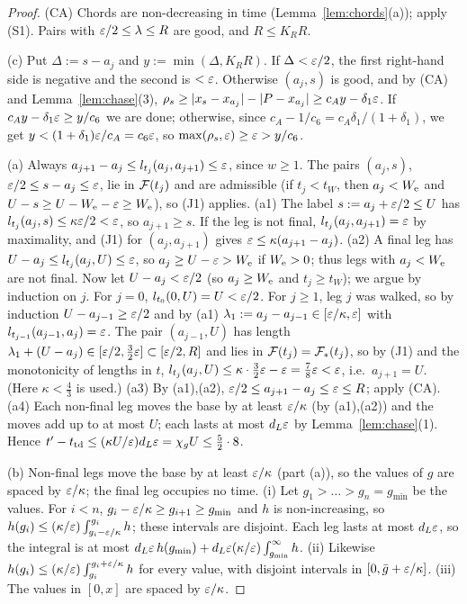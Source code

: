 \begin{proof}
(CA) Chords are non-decreasing in time (Lemma~\ref{lem:chords}(a)); apply (S1). Pairs with $\varepsilon/2\le\lambda\le R$ are
good, and $R\le K_RR$.

(c) Put $\Delta:=s-a_j$ and $y:=\min(\Delta,K_RR)$. If $\Delta<\varepsilon/2$, the first right-hand side is negative and the second is
$<\varepsilon$. Otherwise $(a_j,s)$ is good, and by (CA) and Lemma~\ref{lem:chase}(3),
$\rho_s\ge|x_s-x_{a_j}|-|P-x_{a_j}|\ge c_Ay-\delta_1\varepsilon$. If $c_Ay-\delta_1\varepsilon\ge y/c_6$ we are done; otherwise,
since $c_A-1/c_6=c_A\delta_1/(1+\delta_1)$, we get $y<(1+\delta_1)\varepsilon/c_A=c_6\varepsilon$, so $\max(\rho_s,\varepsilon)\ge\varepsilon>y/c_6$.

(a) Always $a_{j+1}-a_j\le l_{t_j}(a_j,a_{j+1})\le\varepsilon$, since $w\ge1$. The pairs $(a_j,s)$, $\varepsilon/2\le s-a_j\le\varepsilon$,
lie in $\mathcal{F}(t_j)$ and are admissible (if $t_j<t_W$, then $a_j<W_{\mathrm{e}}$ and $U-s\ge U-W_{\mathrm{e}}-\varepsilon\ge W_{\mathrm{e}}$), so (J1) applies.
(a1) The label $s:=a_j+\varepsilon/2\le U$ has $l_{t_j}(a_j,s)\le\kappa\varepsilon/2<\varepsilon$, so $a_{j+1}\ge s$. If the leg is not
final, $l_{t_j}(a_j,a_{j+1})=\varepsilon$ by maximality, and (J1) for $(a_j,a_{j+1})$ gives $\varepsilon\le\kappa(a_{j+1}-a_j)$.
(a2) A final leg has $U-a_j\le l_{t_j}(a_j,U)\le\varepsilon$, so $a_j\ge U-\varepsilon>W_{\mathrm{e}}$ if $W_{\mathrm{e}}>0$; thus legs with $a_j<W_{\mathrm{e}}$ are
not final. Now let $U-a_j<\varepsilon/2$ (so $a_j\ge W_{\mathrm{e}}$ and $t_j\ge t_W$); we argue by induction on $j$. For $j=0$,
$l_{t_0}(0,U)=U<\varepsilon/2$. For $j\ge1$, leg $j$ was walked, so by induction $U-a_{j-1}\ge\varepsilon/2$ and by (a1)
$\lambda_1:=a_j-a_{j-1}\in[\varepsilon/\kappa,\varepsilon]$ with $l_{t_{j-1}}(a_{j-1},a_j)=\varepsilon$. The pair $(a_{j-1},U)$ has length
$\lambda_1+(U-a_j)\in[\varepsilon/2,\frac32\varepsilon]\subset[\varepsilon/2,R]$ and lies in $\mathcal{F}(t_j)=\mathcal{F}_*(t_j)$, so by (J1) and the
monotonicity of lengths in $t$,
$l_{t_j}(a_j,U)\le\kappa\cdot\frac32\varepsilon-\varepsilon=\frac78\varepsilon<\varepsilon$, i.e.\ $a_{j+1}=U$. (Here $\kappa<\frac43$ is used.)
(a3) By (a1),(a2), $\varepsilon/2\le a_{j+1}-a_j\le\varepsilon\le R$; apply (CA).
(a4) Each non-final leg moves the base by at least $\varepsilon/\kappa$ (by (a1),(a2)) and the moves add up to at most $U$; each
lasts at most $d_L\varepsilon$ by Lemma~\ref{lem:chase}(1). Hence $t'-t_{\mathrm{td}}\le(\kappa U/\varepsilon)d_L\varepsilon=\chi_gU\le\frac52\cdot8$.

(b) Non-final legs move the base by at least $\varepsilon/\kappa$ (part (a)), so the values of $g$ are spaced by
$\varepsilon/\kappa$; the final leg occupies no time. (i) Let $g_1>\dots>g_n=g_{\min}$ be the values. For $i<n$,
$g_i-\varepsilon/\kappa\ge g_{i+1}\ge g_{\min}$ and $h$ is non-increasing, so $h(g_i)\le(\kappa/\varepsilon)\int_{g_i-\varepsilon/\kappa}^{g_i}h$;
these intervals are disjoint. Each leg lasts at most $d_L\varepsilon$, so the integral is at most
$d_L\varepsilon\,h(g_{\min})+d_L\varepsilon(\kappa/\varepsilon)\int_{g_{\min}}^\infty h$. (ii) Likewise
$h(g_i)\le(\kappa/\varepsilon)\int_{g_i}^{g_i+\varepsilon/\kappa}h$ for every value, with disjoint intervals in
$[0,\bar g+\varepsilon/\kappa]$. (iii) The values in $[0,x]$ are spaced by $\varepsilon/\kappa$.
\end{proof}

